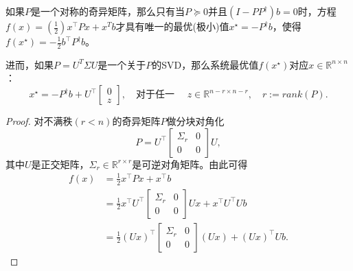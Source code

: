 \begin{subappendices}
\begin{proposition}[奇异矩阵]
  \label{prop:simple-schur-singular-optim}
如果$P$是一个对称的奇异矩阵，那么只有当$P \succeq 0$并且$\left( I-PP^{\dagger}\right) b = 0$时，方程$f(x) = \left(\frac{1}{2}\right) x^{\top} P x + x^T b$才具有唯一的最优(极小)值$x^{\star} = - P^{\dagger} b$，使得$f(x^{\star}) = -\frac{1}{2} b^{\top} P^{\dagger} b$。

进而，如果$P=U^T \Sigma U$是一个关于$P$的SVD，那么系统最优值$f(x^{\star})$对应$x \in \mathbb{R}^{n \times n}$：
\begin{equation*}
  x^{\star} = -P^{\dagger} b + U^{\top} \begin{bmatrix}0 \\ z \end{bmatrix}, \quad \text{对于任一 } \quad z \in \mathbb{R}^{n-r \times n-r}, \quad r:=rank(P).
\end{equation*}
\end{proposition}
\begin{proof}
  对不满秩$(r < n)$的奇异矩阵$P$做分块对角化
  \begin{equation*}
    P = U^{\top} \begin{bmatrix}
    \Sigma_r & 0 \\ 0 & 0
    \end{bmatrix} U,
  \end{equation*}
  其中$U$是正交矩阵，$\Sigma_r \in \mathbb{R}^{r \times r}$是可逆对角矩阵。由此可得
  \begin{equation*}
  \begin{split}
    f(x) &= \frac{1}{2} x^{\top} P x + x^{\top} b \\
    &= \frac{1}{2} x^{\top} U^{\top} \begin{bmatrix}
    \Sigma_r & 0 \\ 0 & 0
  \end{bmatrix} U x + x^{\top} U^{\top} U b \\
  &= \frac{1}{2} \left( U x \right)^{\top} \begin{bmatrix}
  \Sigma_r & 0 \\ 0 & 0
\end{bmatrix} \left(U x\right) + \left( U x \right)^{\top} U b.
  \end{split}
  \end{equation*}


\end{proof}
\end{subappendices}
